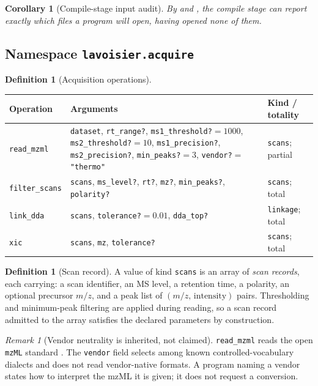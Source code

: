 \documentclass[11pt,twocolumn,a4paper]{article}
\theoremstyle{ssthm}
\newtheorem{corollary}[theorem]{Corollary}
\theoremstyle{definition}
\newtheorem{definition}[theorem]{Definition}
\theoremstyle{remark}
\newtheorem{remark}[theorem]{Remark}
\newcommand{\shk}[1]{\texttt{#1}}
\begin{document}
\begin{corollary}[Compile-stage input audit]
\label{cor:audit}
By  and , the
compile stage can report exactly which files a program will open, having
opened none of them.
\end{corollary}

\subsection{Namespace \shk{lavoisier.acquire}}

\begin{definition}[Acquisition operations]
\label{def:acquire-ops}
\hfill
\begin{longtable}{@{}p{}p{}p{}@{}}
\toprule
\textbf{Operation} & \textbf{Arguments} & \textbf{Kind / totality}\\
\midrule
\endhead
\shk{read\_mzml} &
\shk{dataset}, \shk{rt\_range?}, \shk{ms1\_threshold?}$=1000$,
\shk{ms2\_threshold?}$=10$, \shk{ms1\_precision?}, \shk{ms2\_precision?},
\shk{min\_peaks?}$=3$, \shk{vendor?}$=$\shk{"thermo"} &
\shk{scans}; partial\\
\addlinespace
\shk{filter\_scans} &
\shk{scans}, \shk{ms\_level?}, \shk{rt?}, \shk{mz?},
\shk{min\_peaks?}, \shk{polarity?} &
\shk{scans}; total\\
\addlinespace
\shk{link\_dda} &
\shk{scans}, \shk{tolerance?}$=0.01$, \shk{dda\_top?} &
\shk{linkage}; total\\
\addlinespace
\shk{xic} &
\shk{scans}, \shk{mz}, \shk{tolerance?} &
\shk{scans}; total\\
\bottomrule
\end{longtable}
\end{definition}

\begin{definition}[Scan record]
\label{def:scan}
A value of kind \shk{scans} is an array of \emph{scan records}, each
carrying: a scan identifier, an MS level, a retention time, a polarity,
an optional precursor $m/z$, and a peak list of $(m/z,\,\text{intensity})$
pairs. Thresholding and minimum-peak filtering are applied during
reading, so a scan record admitted to the array satisfies the declared
parameters by construction.
\end{definition}

\begin{remark}[Vendor neutrality is inherited, not claimed]
\label{rem:vendor}
\shk{read\_mzml} reads the open \shk{mzML} standard
\citep{martens2011mzml,deutsch2008mzml}. The \shk{vendor} field selects
among known controlled-vocabulary dialects and does not read
vendor-native formats. A program naming a vendor states how to interpret
the mzML it is given; it does not request a conversion.
\end{remark}
\end{document}
